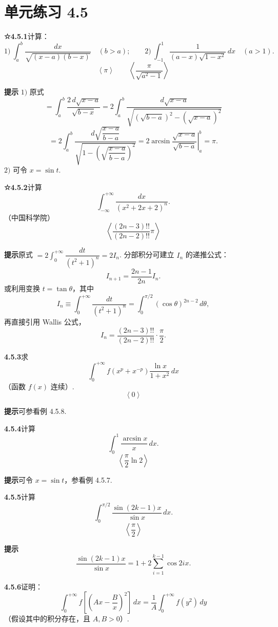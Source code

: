 \documentclass[UTF8, 12pt, fontset=fandol, oneside]{ctexart}
\begin{document}
\section*{单元练习 4.5}

\noindent\textbf{☆4.5.1}\quad 计算：
\[
1)\ \int_a^b\frac{dx}{\sqrt{(x-a)(b-x)}}\quad(b>a);\qquad
2)\ \int_{-1}^1\frac1{(a-x)\sqrt{1-x^2}}\,dx\quad(a>1).
\]
\[
\left\langle \pi \right\rangle\qquad
\left\langle \frac{\pi}{\sqrt{a^2-1}} \right\rangle
\]

\noindent\textbf{提示}\quad
$1)$ 原式
\[
=\int_a^b\frac{2\,d\sqrt{x-a}}{\sqrt{b-x}}
=2\int_a^b\frac{d\sqrt{x-a}}{\sqrt{(\sqrt{b-a})^2-(\sqrt{x-a})^2}}
\]
\[
=2\int_a^b\frac{d\sqrt{\dfrac{x-a}{b-a}}}
{\sqrt{1-\left(\sqrt{\dfrac{x-a}{b-a}}\right)^2}}
=2\arcsin\left.\frac{\sqrt{x-a}}{\sqrt{b-a}}\right|_a^b=\pi.
\]
$2)$ 可令 $x=\sin t$.

\noindent\textbf{☆4.5.2}\quad 计算
\[
\int_{-\infty}^{+\infty}\frac{dx}{(x^2+2x+2)^n}.
\]
（中国科学院）
\[
\left\langle \frac{(2n-3)!!}{(2n-2)!!}\pi \right\rangle
\]

\noindent\textbf{提示}\quad 原式 $=2\displaystyle\int_0^{+\infty}\dfrac{dt}{(t^2+1)^n}=2I_n$. 分部积分可建立 $I_n$ 的递推公式：
\[
I_{n+1}=\frac{2n-1}{2n}I_n.
\]
或利用变换 $t=\tan\theta$，其中
\[
I_n\equiv\int_0^{+\infty}\frac{dt}{(t^2+1)^n}
=\int_0^{\pi/2}(\cos\theta)^{2n-2}\,d\theta,
\]
再直接引用 Wallis 公式，
\[
I_n=\frac{(2n-3)!!}{(2n-2)!!}\cdot\frac\pi2.
\]

\noindent\textbf{4.5.3}\quad 求
\[
\int_0^{+\infty}f(x^p+x^{-p})\frac{\ln x}{1+x^2}\,dx
\]
（函数 $f(x)$ 连续）.
\[
\left\langle 0 \right\rangle
\]

\noindent\textbf{提示}\quad 可参看例 4.5.8.

\noindent\textbf{4.5.4}\quad 计算
\[
\int_0^1\frac{\arcsin x}{x}\,dx.
\]
\[
\left\langle\frac\pi2\ln2\right\rangle
\]

\noindent\textbf{提示}\quad 可令 $x=\sin t$，参看例 4.5.7.

\noindent\textbf{4.5.5}\quad 计算
\[
\int_0^{\pi/2}\frac{\sin(2k-1)x}{\sin x}\,dx.
\]
\[
\left\langle\frac\pi2\right\rangle
\]

\noindent\textbf{提示}\quad
\[
\frac{\sin(2k-1)x}{\sin x}=1+2\sum_{i=1}^{k-1}\cos2ix.
\]

\noindent\textbf{4.5.6}\quad 证明：
\[
\int_0^{+\infty}f\left[\left(Ax-\frac Bx\right)^2\right]\,dx
=\frac1A\int_0^{+\infty}f(y^2)\,dy
\]
（假设其中的积分存在，且 $A,B>0$）.
\end{document}
